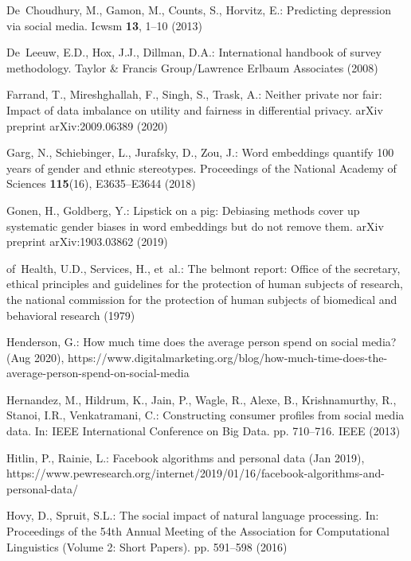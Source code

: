 \documentclass[11pt]{article} %
\begin{document}
\begin{thebibliography}{10}
\begin{small}
De~Choudhury, M., Gamon, M., Counts, S., Horvitz, E.: Predicting depression via
  social media. Icwsm  \textbf{13},  1--10 (2013)

De~Leeuw, E.D., Hox, J.J., Dillman, D.A.: International handbook of survey
  methodology. Taylor \& Francis Group/Lawrence Erlbaum Associates (2008)

Farrand, T., Mireshghallah, F., Singh, S., Trask, A.: Neither private nor fair:
  Impact of data imbalance on utility and fairness in differential privacy.
  arXiv preprint arXiv:2009.06389  (2020)

Garg, N., Schiebinger, L., Jurafsky, D., Zou, J.: Word embeddings quantify 100
  years of gender and ethnic stereotypes. Proceedings of the National Academy
  of Sciences  \textbf{115}(16),  E3635--E3644 (2018)

Gonen, H., Goldberg, Y.: Lipstick on a pig: {Debiasing} methods cover up
  systematic gender biases in word embeddings but do not remove them. arXiv
  preprint arXiv:1903.03862  (2019)

of~Health, U.D., Services, H., et~al.: The belmont report: Office of the
  secretary, ethical principles and guidelines for the protection of human
  subjects of research, the national commission for the protection of human
  subjects of biomedical and behavioral research (1979)

Henderson, G.: How much time does the average person spend on social media?
  (Aug 2020),
  https://www.digitalmarketing.org/blog/how-much-time-does-the-average-person-spend-on-social-media

Hernandez, M., Hildrum, K., Jain, P., Wagle, R., Alexe, B., Krishnamurthy, R.,
  Stanoi, I.R., Venkatramani, C.: Constructing consumer profiles from social
  media data. In: {IEEE} {International} {Conference} on {Big} {Data}. pp.
  710--716. IEEE (2013)

Hitlin, P., Rainie, L.: Facebook algorithms and personal data (Jan 2019),
  https://www.pewresearch.org/internet/2019/01/16/facebook-algorithms-and-personal-data/

Hovy, D., Spruit, S.L.: The social impact of natural language processing. In:
  Proceedings of the 54th {Annual} {Meeting} of the {Association} for
  {Computational} {Linguistics} ({Volume} 2: {Short} {Papers}). pp. 591--598
  (2016)


\end{small}
\end{thebibliography}
\end{document}
